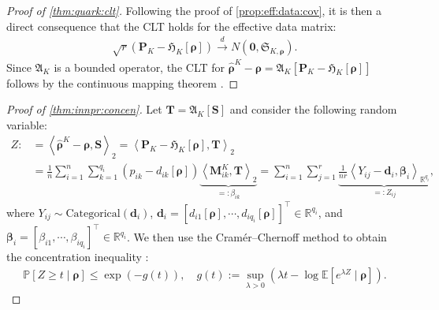 \documentclass[noinfoline]{imsart}\setcounter{tocdepth}{2}
\renewcommand{\b}[1]{\mathbb{#1}} %
\newcommand{\m}[1]{\mathbf{#1}} %
\newcommand{\f}[1]{\mathfrak{#1}} %
\newcommand{\mb}[1]{\boldsymbol{#1}} %
\newcommand{\innpr}[2]{{\left\langle {#1},{#2}\right\rangle}} %
\theoremstyle{plain}
\begin{document}
\begin{appendix}
\begin{proof}[Proof of \cref{thm:quark:clt}]
Following the proof of \cref{prop:eff:data:cov}, it is then a direct consequence that the CLT holds for the effective data matrix:
\begin{align*}
\sqrt{r}(\m{P}_K - \f{H}_K [\mb{\rho}]) \xrightarrow{d}  N\left(\m{0}, \f{S}_{K, \mb{\rho}} \right).
\end{align*}
Since $\f{A}_{K}$ is a bounded operator, the CLT for $\hat{\mb{\rho}}^{K} - \mb{\rho} = \f{A}_{K} \left[ \m{P}_K - \f{H}_K [\mb{\rho}] \right]$ follows by the continuous mapping theorem \cite{billingsley2013convergence}.
\end{proof}


\begin{proof}[Proof of \cref{thm:innpr:concen}]
Let $\m{T} = \f{A}_{K} [\m{S}]$ and consider the following random variable:
\begin{align*}
    Z :&= \innpr{\hat{\mb{\rho}}^{K} - \mb{\rho}}{\m{S}}_{2} = \innpr{\m{P}_K - \f{H}_K [\mb{\rho}]}{\m{T}}_{2} \\
    &= \frac{1}{n} \sum_{i=1}^{n} \sum_{k=1}^{q_{i}} (p_{ik} - d_{ik}[\mb{\rho}]) \underbrace{\innpr{\m{M}_{ik}^{K}}{\m{T}}_{2}}_{=:\beta_{ik}} 
    = \sum_{i=1}^{n} \sum_{j=1}^{r} \underbrace{\frac{1}{nr} \innpr{Y_{ij} - \m{d}_{i}}{\mb{\beta}_{i}}_{\b{R}^{q_{i}}}}_{=:Z_{ij}},
\end{align*}
where $Y_{ij} \sim \mathrm{Categorical}(\m{d}_{i})$, $\m{d}_{i} = [d_{i1}[\mb{\rho}], \cdots, d_{iq_{i}}[\mb{\rho}]]^{\top} \in \b{R}^{q_{i}}$, and $\mb{\beta}_{i} = [\beta_{i1}, \cdots, \beta_{iq_{i}}]^{\top} \in \b{R}^{q_{i}}$. We then use the Cram\'{e}r–Chernoff method to obtain the concentration inequality \cite{boucheron2003concentration}:
\begin{align*}
    \b{P} \left[Z \ge t \mid \mb{\rho} \right] \le \exp ( - g(t)), \quad g(t) := \sup_{\lambda > 0} (\lambda t - \log \b{E} \left[ e^{\lambda Z} \mid \mb{\rho} \right]).
\end{align*}


\end{proof}
\end{appendix}
\end{document}
